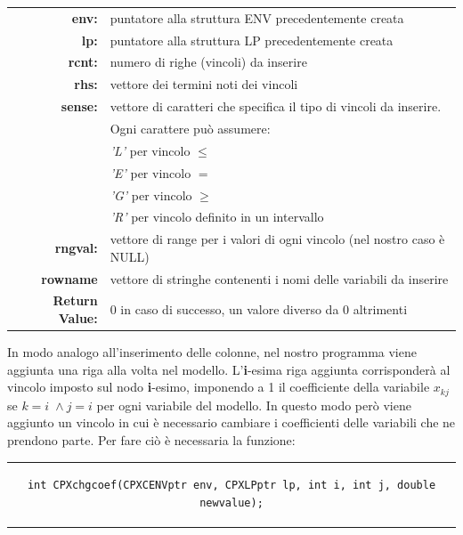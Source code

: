 \begin{table}[h]
\centering
\begin{tabular}{rl}
\textbf{env:} & {puntatore alla struttura ENV precedentemente creata}\\
\textbf{lp:} & {puntatore alla struttura LP precedentemente creata}\\
\textbf{rcnt:} & {numero di righe (vincoli) da inserire}\\
\textbf{rhs:} & {vettore dei termini noti dei vincoli}\\
\textbf{sense:} & {vettore di caratteri che specifica il tipo di vincoli da inserire.}\\
&{Ogni carattere può assumere:}\\
&{\textit{'L'} per vincolo $\leq$}\\
&{\textit{'E'} per vincolo $=$}\\
&{\textit{'G'} per vincolo $\geq$}\\
&{\textit{'R'} per vincolo definito in un intervallo}\\
\textbf{rngval:} & {vettore di range per i valori di ogni vincolo (nel nostro caso è NULL)}\\
\textbf{rowname} & {vettore di stringhe contenenti i nomi delle variabili da inserire}\\
\textbf{Return Value:} & {0 in caso di successo, un valore diverso da 0 altrimenti}\\
\end{tabular}
\end{table}
In modo analogo all'inserimento delle colonne, nel nostro programma viene aggiunta una riga alla volta nel modello. L'\textbf{i}-esima riga aggiunta corrisponderà al vincolo imposto sul nodo \textbf{i}-esimo, imponendo a 1 il coefficiente della variabile $x_{kj}$ se $k=i \;\wedge j=i$ per ogni variabile del modello. In questo modo però viene aggiunto un vincolo in cui è necessario cambiare i coefficienti delle variabili che ne prendono parte. Per fare ciò è necessaria la funzione:
\begin{center}
\begin{tabular}{c}
\begin{lstlisting}[linewidth=380pt, basicstyle=\footnotesize\sffamily,]   
int CPXchgcoef(CPXCENVptr env, CPXLPptr lp, int i, int j, double newvalue);
\end{lstlisting}
\end{tabular}
\end{center}
